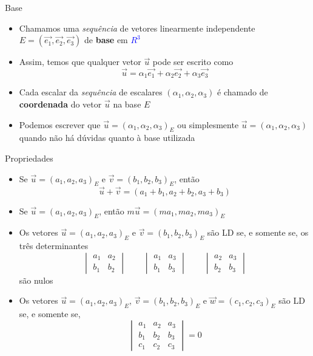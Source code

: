 \begin{frame}{Base}
    \begin{itemize}
        \item Chamamos uma \textit{sequência} de vetores linearmente independente \(E=(\vec{e_1}, \vec{e_2}, \vec{e_3})\)
            de \textbf{base} em \textcolor{blue}{\(R^3\)}
        \item Assim, temos que qualquer vetor \(\vec{u}\) pode ser escrito como
            \[
                \vec{u} = \alpha_1 \vec{e_1} + \alpha_2 \vec{e_2} + \alpha_3 \vec{e_3}
            \]
        \item Cada escalar da \textit{sequência} de escalares \((\alpha_1, \alpha_2, \alpha_3)\) é chamado de
            \textbf{coordenada} do vetor \(\vec{u}\) na base \(E\)
        \item Podemos escrever que \(\vec{u} = (\alpha_1, \alpha_2, \alpha_3)_E\) ou simplesmente
            \(\vec{u} = (\alpha_1, \alpha_2, \alpha_3)\) quando não há dúvidas quanto à base utilizada
    \end{itemize}
\end{frame}

\begin{frame}{Propriedades}
    \begin{itemize}
        \item Se \(\vec{u}=(a_1,a_2,a_3)_E\) e \(\vec{v}=(b_1,b_2,b_3)_E\), então
            \[
                \vec{u}+\vec{v}=(a_1+b_1,a_2+b_2,a_3+b_3)
            \]
        \item Se \(\vec{u}=(a_1,a_2,a_3)_E\), então \(m\vec{u}=(m a_1,m a_2,m a_3)_E\)
        \item Os vetores \(\vec{u}=(a_1,a_2,a_3)_E\) e \(\vec{v}=(b_1,b_2,b_3)_E\) são LD se, e somente se,
            os três determinantes
            \[
                \begin{vmatrix}
                    a_1 & a_2 \\ b_1 & b_2
                \end{vmatrix} \qquad
                \begin{vmatrix}
                    a_1 & a_3 \\ b_1 & b_3
                \end{vmatrix} \qquad
                \begin{vmatrix}
                    a_2 & a_3 \\ b_2 & b_3
                \end{vmatrix}
            \]
            são nulos
        \item Os vetores \(\vec{u}=(a_1,a_2,a_3)_E\), \(\vec{v}=(b_1,b_2,b_3)_E\) e \(\vec{w}=(c_1,c_2,c_3)_E\) são LD se, e somente se,
            \[
                \begin{vmatrix}
                    a_1 & a_2 & a_3 \\ b_1 & b_2 & b_3 \\ c_1 & c_2 & c_3
                \end{vmatrix} = 0
            \]
    \end{itemize}
\end{frame}

